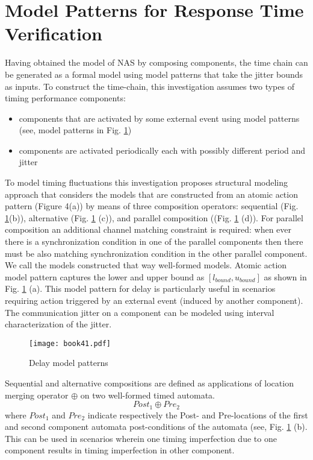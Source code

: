 \documentclass[letterpaper, 10 pt, conference]{ieeeconf}
\begin{document}
\section{Model Patterns for Response Time Verification}
Having obtained the model of NAS by composing components, the time chain can be generated as a formal model using model patterns that take the jitter bounds as inputs. To construct the time-chain, this investigation assumes two types of timing performance components:
\begin{itemize}
	\item components that are activated by some external event using model patterns (see, model patterns in Fig. \ref{fig:ModelPattern})
	\item components are activated periodically each with possibly different period and jitter
\end{itemize}
To model timing fluctuations this investigation proposes structural modeling approach that considers the models that are constructed from an atomic action pattern (Figure 4(a)) by means of three composition operators: sequential (Fig. \ref{fig:ModelPattern}(b)), alternative  (Fig. \ref{fig:ModelPattern} (c)), and parallel composition ((Fig. \ref{fig:ModelPattern} (d)). For parallel composition an additional channel matching constraint is required: when ever there is a synchronization condition in one of the parallel components then there must be also matching synchronization condition in the other parallel component. We call the models constructed that way well-formed models. Atomic action model pattern captures the lower and upper bound as $[l_{bound}, u_{bound}]$ as shown in Fig. \ref{fig:ModelPattern} (a). This model pattern for delay is particularly useful in scenarios requiring action triggered by an external event (induced by another component). The communication jitter on a component can be modeled using interval characterization of the jitter. 
\begin{figure}[h]
\centering
\texttt{[image: book41.pdf]}
\caption{Delay model patterns}
\label{fig:ModelPattern}
\end{figure}

Sequential and alternative compositions are defined as applications of location merging operator $\oplus$ on two well-formed timed automata.
\begin{equation}
Post_1 \oplus Pre_2
\label{eq:SeqComp}
\end{equation}
where $Post_1$ and $Pre_2$ indicate respectively the Post- and Pre-locations of the first and second component automata post-conditions of the automata (see, Fig. \ref{fig:ModelPattern} (b). This can be used in scenarios wherein one timing imperfection due to one component results in timing imperfection in other component. 
\end{document}
